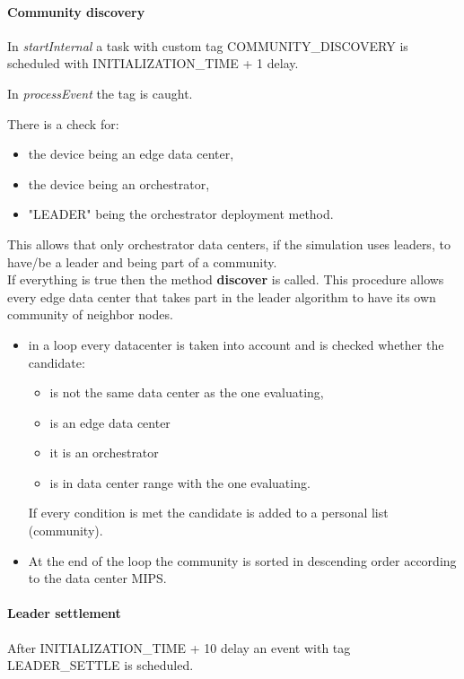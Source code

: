 \documentclass[12pt]{report}
\begin{document}
\paragraph*{Community discovery} In \textit{startInternal} a task with custom tag COMMUNITY\_DISCOVERY is scheduled with INITIALIZATION\_TIME + 1 delay.

In \textit{processEvent} the tag is caught.

There is a check for:
\begin{itemize}
 	\item the device being an edge data center,
 	\item the device being an orchestrator,
 	\item "LEADER" being the orchestrator deployment method.
\end{itemize}
This allows that only orchestrator data centers, if the simulation uses leaders, to have/be a leader and being part of a community.\\
  	

If everything is true then the method \textbf{discover} is called.
This procedure allows every edge data center that takes part in the leader algorithm to have its own community of neighbor nodes.
\begin{itemize}
	\item in a loop every datacenter is taken into account and is checked whether the candidate:
	\begin{itemize}
		\item is not the same data center as the one evaluating,
		\item is an edge data center
		\item it is an orchestrator
		\item is in data center range with the one evaluating.
 	\end{itemize}
	If every condition is met the candidate is added to a personal list (community).
	\item At the end of the loop the community is sorted in descending order according to the data center MIPS.
\end{itemize}

 	
\paragraph*{Leader settlement}After INITIALIZATION\_TIME + 10 delay an event with tag LEADER\_SETTLE is scheduled.
\end{document}
